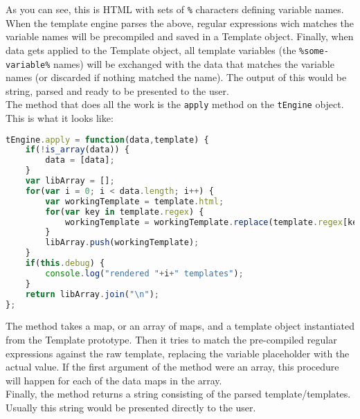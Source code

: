 As you can see, this is HTML with sets of \verb$%$ characters defining variable names. When the template engine parses the above, regular expressions wich matches the variable names will be precompiled and saved in a Template object. Finally, when data gets applied to the Template object, all template variables (the \verb$%some-variable%$ names) will be exchanged with the data that matches the variable names (or discarded if nothing matched the name).
The output of this would be string, parsed and ready to be presented to the user.
\\
The method that does all the work is the \verb$apply$ method on the \verb$tEngine$ object. This is what it looks like:
\begin{lstlisting}[language=JavaScript,caption=The javascript engine apply method]
tEngine.apply = function(data,template) {
    if(!is_array(data)) {
        data = [data];
    }
    var libArray = [];
    for(var i = 0; i < data.length; i++) {
        var workingTemplate = template.html;
        for(var key in template.regex) {
            workingTemplate = workingTemplate.replace(template.regex[key],data[i][key]);
        }
        libArray.push(workingTemplate);
    }
	if(this.debug) {
		console.log("rendered "+i+" templates");
	}
    return libArray.join("\n");
};
\end{lstlisting}
The method takes a map, or an array of maps, and a template object instantiated from the Template prototype.
Then it tries to match the pre-compiled regular expressions against the raw template, replacing the variable placeholder with the actual value. If the first argument of the method were an array, this procedure will happen for each of the data maps in the array.
\\
Finally, the method returns a string consisting of the parsed template/templates. Usually this string would be presented directly to the user.